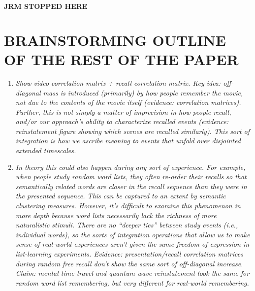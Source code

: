 \documentclass{article}
\begin{document}

\textbf{JRM STOPPED HERE}

\section*{BRAINSTORMING OUTLINE OF THE REST OF THE PAPER}
\begin{enumerate}
  \item \textit{Show video correlation matrix + recall correlation matrix.  Key idea: off-diagonal mass is introduced (primarily) by how people \textit{remember} the movie, not due to the contents of the movie itself (evidence: correlation matrices).  Further, this is not simply a matter of imprecision in how people recall, and/or our approach's ability to characterize recalled events (evidence: reinstatement figure showing which scenes are recalled similarly).  This sort of integration is how we ascribe meaning to events that unfold over disjointed extended timescales.}
  \item \textit{In theory this could also happen during \textit{any} sort of experience.  For example, when people study random word lists, they often re-order their recalls so that semantically related words are closer in the recall sequence than they were in the presented sequence.  This can be captured to an extent by semantic clustering measures.  However, it's difficult to examine this phenomenon in more depth because word lists necessarily lack the richness of more naturalistic stimuli.  There are no ``deeper ties'' between study events (i.e., individual words), so the sorts of integration operations that allow us to make sense of real-world experiences aren't given the same freedom of expression in list-learning experiments.  Evidence: presentation/recall correlation matrices during random free recall don't show the same sort of off-diagonal increase.  Claim: mental time travel and quantum wave reinstatement look the same for random word list remembering, but very different for real-world remembering.}

\end{enumerate}
\end{document}
